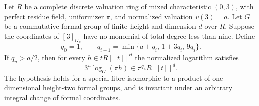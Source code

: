 \begin{lemma}
\label{lem:B-RD34-log}
Let $R$ be a complete discrete valuation ring of mixed characteristic
$(0,3)$, with perfect residue field, uniformizer $\pi$, and normalized
valuation $v(3)=a$. Let $G$ be a commutative formal group of finite height
and dimension $d$ over $R$. Suppose the coordinates of $[3]_{G_k}$ have
no monomial of total degree less than nine. Define
\[
 q_0=1,\qquad q_{i+1}=\min\{a+q_i,\,1+3q_i,\,9q_i\}.
                                                        \tag{B-RD34.1}
\]
If $q_u>a/2$, then for every $h\in tR[[t]]^d$ the normalized logarithm
satisfies
\[
       3^u\log_G(\pi h)\in\pi^{q_u}R[[t]]^d.
                                                        \tag{B-RD34.2}
\]
The hypothesis holds for a special fibre isomorphic to a product of
one-dimensional height-two formal groups, and is invariant under an
arbitrary integral change of formal coordinates.
\end{lemma}

